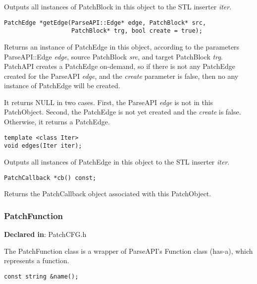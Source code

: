 Outputs all instances of PatchBlock in this object to the STL inserter \emph{iter}.


\begin{verbatim}
PatchEdge *getEdge(ParseAPI::Edge* edge, PatchBlock* src,
                   PatchBlock* trg, bool create = true);

\end{verbatim}



Returns an instance of PatchEdge in this object, according to the parameters
ParseAPI::Edge \emph{edge}, source PatchBlock \emph{src}, and target PatchBlock
\emph{trg}. PatchAPI creates a PatchEdge on-demand, so if there is not any PatchEdge
created for the ParseAPI \emph{edge}, and the \emph{create} parameter is false, then no
any instance of PatchEdge will be created.

It returns NULL in two cases. First, the ParseAPI \emph{edge} is not in this
PatchObject. Second, the PatchEdge is not yet created and the \emph{create} is
false. Otherwise, it returns a PatchEdge.


\begin{verbatim}
template <class Iter>
void edges(Iter iter);

\end{verbatim}



Outputs all instances of PatchEdge in this object to the STL inserter \emph{iter}.


\begin{verbatim}
PatchCallback *cb() const;

\end{verbatim}



Returns the PatchCallback object associated with this PatchObject.

\subsubsection{PatchFunction}
\label{sec-3.2.9}

\textbf{Declared in}: PatchCFG.h

The PatchFunction class is a wrapper of ParseAPI's Function class (has-a), which
represents a function.


\begin{verbatim}
const string &name();

\end{verbatim}



